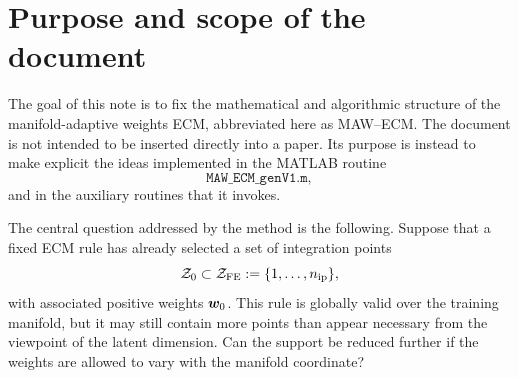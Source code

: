 \documentclass[11pt,a4paper]{article}
\begin{document}
\begin{abstract}
The redistribution process operates in two regimes. First, an inexpensive
least-change stage attempts to eliminate points without explicit positivity
enforcement. Once this becomes impossible, the method switches to a
graph-regularized active-set redistribution stage in which positivity is
enforced while neighboring manifold states are coupled through a graph
Laplacian. This graph coupling is introduced to moderate the loss of regularity
caused by local active-set transitions in the adaptive weights.

The retained integration points are common to all sampled manifold states,
whereas the associated weights vary over the latent manifold. Consequently, the
method lies between a fully global ECM rule, where both support and weights are
fixed, and a fully local cubature strategy, where both support and weights would
be recomputed independently at each state.

The present implementation is specialized to a bivariate latent manifold, in
which the sampled states lie on a structured two-dimensional grid. This
assumption is used primarily in the construction of the graph regularization
operator and in the visualization of the adaptive weight fields. The algebraic
structure of MAW--ECM itself is more general and extends naturally to latent
manifolds of dimension $\Nlat>2$, provided that a suitable neighborhood graph or
discrete manifold connectivity is available.
\end{abstract}

\tableofcontents

\section{Purpose and scope of the document}

The goal of this note is to fix the mathematical and algorithmic structure of
the manifold-adaptive weights ECM, abbreviated here as MAW--ECM. The document is
not intended to be inserted directly into a paper. Its purpose is instead to
make explicit the ideas implemented in the MATLAB routine
\[
        \texttt{MAW\_ECM\_genV1.m},
\]
and in the auxiliary routines that it invokes.

The central question addressed by the method is the following. Suppose that a
fixed ECM rule has already selected a set of integration points
\[
        \mathcal{Z}_{0} \subset \mathcal{Z}_{\mathrm{FE}} := \{1,\ldots,n_{\mathrm{ip}}\},
\]
with associated positive weights $\bm w_{0}$. This rule is globally valid over the
training manifold, but it may still contain more points than appear necessary
from the viewpoint of the latent dimension. Can the support be reduced further
if the weights are allowed to vary with the manifold coordinate?
\end{document}
